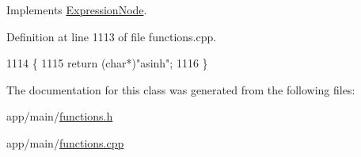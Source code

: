 Implements \hyperlink{classExpressionNode_a42a5e9562b0f645a19dcc83f698069b5}{Expression\+Node}.



Definition at line 1113 of file functions.\+cpp.


\begin{DoxyCode}
1114 \{
1115     \textcolor{keywordflow}{return} (\textcolor{keywordtype}{char}*)\textcolor{stringliteral}{"asinh"};
1116 \}
\end{DoxyCode}


The documentation for this class was generated from the following files\+:\begin{DoxyCompactItemize}
\item 
app/main/\hyperlink{functions_8h}{functions.\+h}\item 
app/main/\hyperlink{functions_8cpp}{functions.\+cpp}\end{DoxyCompactItemize}
